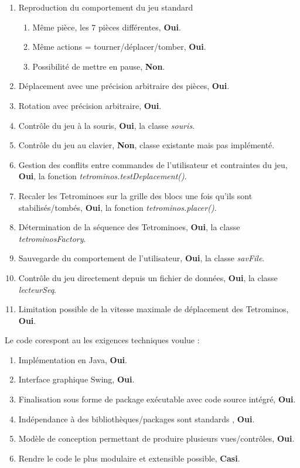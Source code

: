 \documentclass{article}           %
\begin{document}
\begin{enumerate}
  \item Reproduction du comportement du jeu standard 
  		\begin{enumerate}
		  \item Même pièce, les 7 pièces différentes, \textbf{Oui}.	
		  \item Même actions = tourner/déplacer/tomber, \textbf{Oui}.
		  \item Possibilité de mettre en pause, \textbf{Non}.
		\end{enumerate}

  \item Déplacement avec une précision arbitraire des pièces, \textbf{Oui}.
  \item Rotation avec précision arbitraire, \textbf{Oui}.
  \item Contrôle du jeu à la souris, \textbf{Oui}, la classe \emph{souris}.
  \item Contrôle du jeu au clavier, \textbf{Non}, classe existante mais pas implémenté.
  \item Gestion des conflits entre commandes de l'utilisateur et contraintes du jeu, \textbf{Oui}, la fonction \emph{tetrominos.testDeplacement()}.
  \item Recaler les Tetrominoes sur la grille des blocs une fois qu'ils sont stabilisés/tombés, \textbf{Oui}, la fonction \emph{tetrominos.placer()}.
  \item Détermination de la séquence des Tetrominoes, \textbf{Oui}, la classe \emph{tetrominosFactory}.
  \item Sauvegarde du comportement de l'utilisateur, \textbf{Oui}, la classe \emph{savFile}.
  \item Contrôle du jeu directement depuis un fichier de données, \textbf{Oui}, la classe \emph{lecteurSeq}.
  \item Limitation possible de la vitesse maximale de déplacement des Tetrominos, \textbf{Oui}.

 \end{enumerate}

Le code corespont au les exigences techniques voulue : 

\begin{enumerate}
	\item Implémentation en Java, \textbf{Oui}.	
	\item Interface graphique Swing, \textbf{Oui}.
	\item Finalisation sous forme de package exécutable avec code source intégré, \textbf{Oui}.
	\item Indépendance à des bibliothèques/packages sont standards , \textbf{Oui}.
	\item Modèle de conception permettant de produire plusieurs vues/contrôles, \textbf{Oui}.
	\item Rendre le code le plus modulaire et extensible possible, \textbf{Casi}.
\end{enumerate}
 											 
\end{document}

